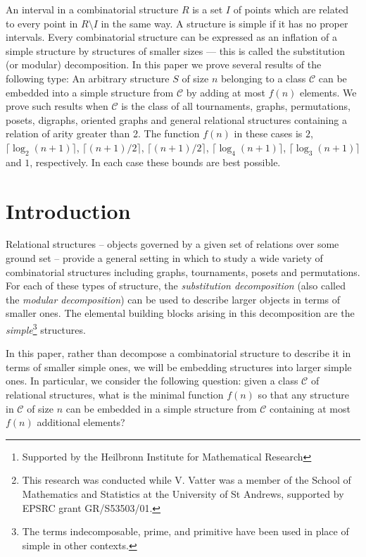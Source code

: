 \documentclass[11pt]{article}
\title{\sc{Simple Extensions of Combinatorial Structures}}
\author{Robert Brignall\footnote{Supported by the Heilbronn Institute for Mathematical Research}\\[-0.25ex]
\small Department of Mathematics\\[-0.5ex]
\small University of Bristol\\[-0.5ex]
\small Bristol,  BS8 1TW\\[-0.5ex]
\small England\\[1.5ex]
Nik Ru\v{s}kuc\\[-0.25ex]
\small Department of Mathematics and Statistics\\[-0.5ex]
\small University of St Andrews\\[-0.5ex]
\small St Andrews, KY16 9SS\\[-0.5ex]
\small Scotland\\[1.5ex]
Vincent Vatter\footnote{This research was conducted while V. Vatter was a member of the School of Mathematics and Statistics at the University of St Andrews, supported by EPSRC grant GR/S53503/01.}\\[-0.25ex]
\small Department of Mathematics\\[-0.5ex]
\small Dartmouth College\\[-0.5ex]
\small Hanover, New Hampshire 03755\\[-0.5ex]
\small U.S.A.\\[-10pt]
}
\date{}
\renewenvironment{abstract}                {
                  \begin{list}{}                     {\setlength{\rightmargin}{1in}                      \setlength{\leftmargin}{1in}}                   \item[]\ignorespaces\begin{small}}                 {\end{small}\unskip\end{list}}
\begin{document}
\maketitle

\pagestyle{main}

\begin{abstract}
An interval in a combinatorial structure $R$ is a set $I$ of points which are related to every point in $R\setminus I$ in the same way.
A structure is simple if it has no proper intervals.
Every combinatorial structure can be expressed as an inflation of a simple structure by structures of smaller sizes --- this is called the substitution (or modular) decomposition.
In this paper we prove several results of the following type: An arbitrary structure $S$ of size $n$ belonging to a class $\mathcal{C}$ can be embedded into a simple structure from $\mathcal{C}$ by adding at most
$f(n)$ elements.
We prove such results when $\mathcal{C}$ is the class of all tournaments, graphs, permutations, posets, digraphs, oriented graphs and general relational structures containing a relation of arity greater than 2.  The function $f(n)$ in
these cases is $2$, $\lceil \log_2(n+1)\rceil$, $\lceil (n+1)/2\rceil$, $\lceil (n+1)/2\rceil$, $\lceil \log_4(n+1)\rceil$, $\lceil \log_3(n+1)\rceil$ and $1$, respectively.  In each case these bounds are best possible.
\end{abstract}

\section{Introduction}

Relational structures -- objects governed by a given set of relations over some ground set -- provide a general setting in which to study a wide variety of combinatorial structures including graphs, tournaments, posets and permutations. For each of these types of structure, the \emph{substitution decomposition} (also called the \emph{modular decomposition}) can be used to describe larger objects in terms of smaller ones. The elemental building blocks arising in this decomposition are the \emph{simple}\footnote{The terms indecomposable, prime, and primitive have been used in place of simple in other contexts.} structures.

In this paper, rather than decompose a combinatorial structure to describe it in terms of smaller simple ones, we will be embedding structures into larger simple ones. In particular, we consider the following question: given a class $\mathcal{C}$ of relational structures, what is the minimal function $f(n)$ so that any structure in $\mathcal{C}$ of size $n$ can be embedded in a simple structure from $\mathcal{C}$ containing at most $f(n)$ additional elements?
\end{document}
